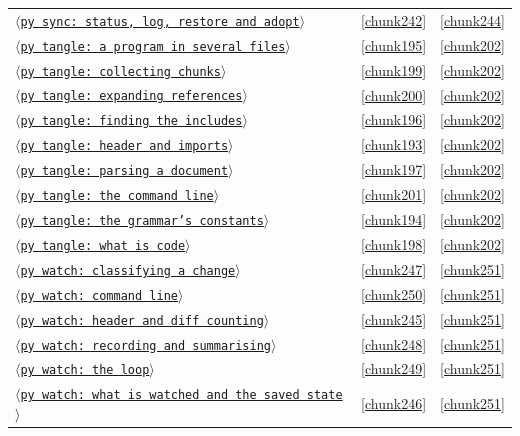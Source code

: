 \documentclass[10pt,a4paper]{article}
\newcounter{chunk}
\newcommand{\chunkname}[1]{\ensuremath{\langle}\texttt{#1}\ensuremath{\rangle}}
\begin{document}
\begin{longtable}{@{}p{}rp{}@{}}
\hyperref[chunk242]{\chunkname{py sync: status, log, restore and adopt}} & \ref*{chunk242} & \hyperref[chunk244]{\ref*{chunk244}} \\
\hyperref[chunk195]{\chunkname{py tangle: a program in several files}} & \ref*{chunk195} & \hyperref[chunk202]{\ref*{chunk202}} \\
\hyperref[chunk199]{\chunkname{py tangle: collecting chunks}} & \ref*{chunk199} & \hyperref[chunk202]{\ref*{chunk202}} \\
\hyperref[chunk200]{\chunkname{py tangle: expanding references}} & \ref*{chunk200} & \hyperref[chunk202]{\ref*{chunk202}} \\
\hyperref[chunk196]{\chunkname{py tangle: finding the includes}} & \ref*{chunk196} & \hyperref[chunk202]{\ref*{chunk202}} \\
\hyperref[chunk193]{\chunkname{py tangle: header and imports}} & \ref*{chunk193} & \hyperref[chunk202]{\ref*{chunk202}} \\
\hyperref[chunk197]{\chunkname{py tangle: parsing a document}} & \ref*{chunk197} & \hyperref[chunk202]{\ref*{chunk202}} \\
\hyperref[chunk201]{\chunkname{py tangle: the command line}} & \ref*{chunk201} & \hyperref[chunk202]{\ref*{chunk202}} \\
\hyperref[chunk194]{\chunkname{py tangle: the grammar's constants}} & \ref*{chunk194} & \hyperref[chunk202]{\ref*{chunk202}} \\
\hyperref[chunk198]{\chunkname{py tangle: what is code}} & \ref*{chunk198} & \hyperref[chunk202]{\ref*{chunk202}} \\
\hyperref[chunk247]{\chunkname{py watch: classifying a change}} & \ref*{chunk247} & \hyperref[chunk251]{\ref*{chunk251}} \\
\hyperref[chunk250]{\chunkname{py watch: command line}} & \ref*{chunk250} & \hyperref[chunk251]{\ref*{chunk251}} \\
\hyperref[chunk245]{\chunkname{py watch: header and diff counting}} & \ref*{chunk245} & \hyperref[chunk251]{\ref*{chunk251}} \\
\hyperref[chunk248]{\chunkname{py watch: recording and summarising}} & \ref*{chunk248} & \hyperref[chunk251]{\ref*{chunk251}} \\
\hyperref[chunk249]{\chunkname{py watch: the loop}} & \ref*{chunk249} & \hyperref[chunk251]{\ref*{chunk251}} \\
\hyperref[chunk246]{\chunkname{py watch: what is watched and the saved state}} & \ref*{chunk246} & \hyperref[chunk251]{\ref*{chunk251}} \\

\end{longtable}
\end{document}
